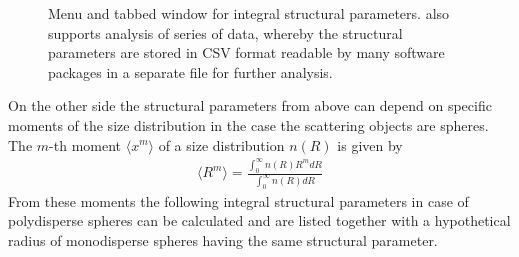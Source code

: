 \begin{figure}[htb]
\captionsetup[subfigure]{position=b}
\centering
{}
\hfill
{}
\caption{Menu and tabbed window for integral structural parameters.
\SASfit also supports analysis of series of data, whereby the
structural parameters are stored in CSV format readable by many
software packages in a separate file for further analysis.}
\label{fig:QTintegralstructuralparameters}
\end{figure}


On the other side the structural parameters from above can depend on
specific moments of the size distribution in the case the scattering
objects are spheres.
 The $m$-th moment $\langle x^m\rangle$ of a size
distribution $n(R)$ is given by
\begin{align}
 \langle R^m\rangle = \frac{\displaystyle  \int_0^\infty n(R) R^m dR }{
\displaystyle \int_0^\infty n(R) dR}
\end{align}
From these moments the following integral structural parameters in
case of polydisperse spheres can be calculated and are listed
together with a hypothetical radius of monodisperse spheres having
the same structural parameter.


